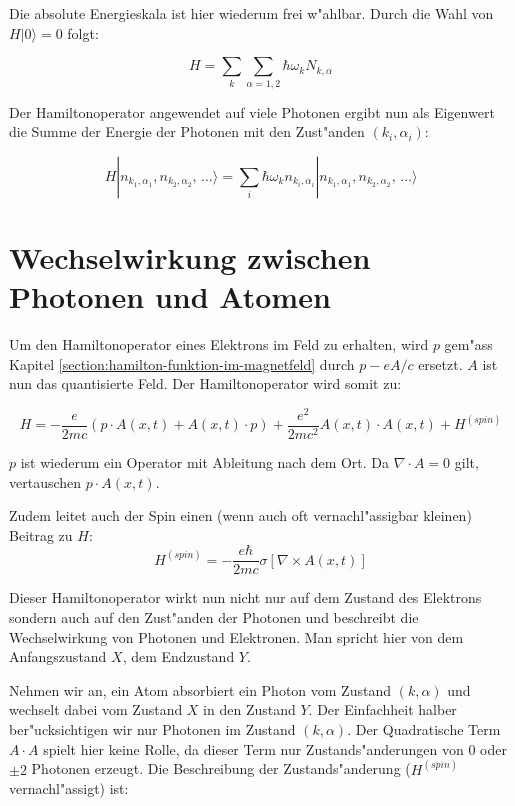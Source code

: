 Die absolute Energieskala ist hier wiederum frei w"ahlbar. Durch die Wahl von $H|0\rangle = 0$ folgt:

\begin{equation}
H = \sum_k \sum_{\alpha=1,2} \hbar \omega_k N_{k,\alpha}
\end{equation}

Der Hamiltonoperator angewendet auf viele Photonen ergibt nun als Eigenwert die Summe der Energie der Photonen mit den Zust"anden $(k_i,\alpha_i)$:

\begin{equation}
H |n_{k_1,\alpha_1}, n_{k_2,\alpha_2}, \, \hdots\rangle = \sum_i \hbar \omega_k n_{k_i,\alpha_i} |n_{k_1,\alpha_1}, n_{k_2,\alpha_2}, \, \hdots\rangle
\end{equation}

\section{Wechselwirkung zwischen Photonen und Atomen}

Um den Hamiltonoperator eines Elektrons im Feld zu erhalten, wird $p$ gem"ass Kapitel \ref{section:hamilton-funktion-im-magnetfeld} durch $p -eA/c$ ersetzt. $A$ ist nun das quantisierte Feld. Der Hamiltonoperator wird somit zu:

\begin{equation}
H = -\frac{e}{2mc}(p \cdot A(x, t) + A(x, t) \cdot p) + \frac{e^2}{2mc^2}A(x, t) \cdot A(x, t) + H^{(spin)}
\end{equation}

$p$ ist wiederum ein Operator mit Ableitung nach dem Ort. Da $\nabla \cdot A = 0$ gilt, vertauschen $p \cdot A(x, t)$.

Zudem leitet auch der Spin einen (wenn auch oft vernachl"assigbar kleinen) Beitrag zu $H$:
\begin{equation}
H^{(spin)} = - \frac{e \hbar}{2mc}\sigma \left[\nabla \times A(x, t)\right]
\end{equation}

Dieser Hamiltonoperator wirkt nun nicht nur auf dem Zustand des Elektrons sondern auch auf den Zust"anden der Photonen und beschreibt die Wechselwirkung von Photonen und Elektronen. Man spricht hier von dem Anfangszustand $X$, dem Endzustand $Y$.

Nehmen wir an, ein Atom absorbiert ein Photon vom Zustand $(k,\alpha)$ und wechselt dabei vom Zustand $X$ in den Zustand $Y$. Der Einfachheit halber ber"ucksichtigen wir nur Photonen im Zustand $(k,\alpha)$. Der Quadratische Term $A \cdot A$ spielt hier keine Rolle, da dieser Term nur Zustands"anderungen von $0$ oder $\pm 2$ Photonen erzeugt. Die Beschreibung der Zustands"anderung ($H^{(spin)}$ vernachl"assigt) ist:

